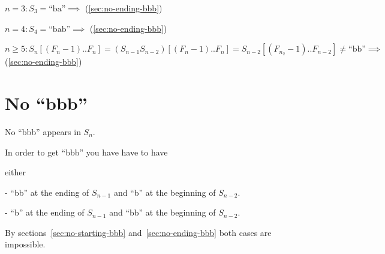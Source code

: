 \documentclass{article}
\begin{document}
\( n = 3: S_{3} = \text{``ba''} \implies \) (\ref{sec:no-ending-bbb})

\( n = 4: S_{4} = \text{``bab''} \implies \) (\ref{sec:no-ending-bbb})

\( n \geq 5: S_{n}[(F_{n}-1)..F_{n}] = (S_{n-1}S_{n-2})[(F_{n}-1)..F_{n}] = S_{n-2}[(F_{n_{2}}-1)..F_{n-2}] \neq \text{``bb''} \implies \) (\ref{sec:no-ending-bbb})

\section{No ``bbb''}\label{sec:no-bbb}

No ``bbb'' appears in \( S_{n} \).

In order to get ``bbb'' you have have to have

either

- ``bb'' at the ending of \( S_{n-1} \) and ``b'' at the beginning of \( S_{n-2} \).

- ``b'' at the ending of \( S_{n-1} \) and ``bb'' at the beginning of \( S_{n-2} \).

By sections~\ref{sec:no-starting-bbb} and~\ref{sec:no-ending-bbb} both cases are impossible.
\end{document}
